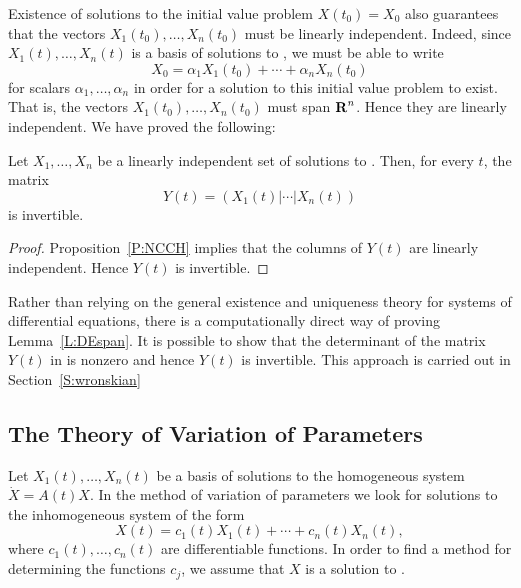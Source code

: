 \documentclass{ximera}
\begin{document}
Existence of solutions to the initial value problem $X(t_0)=X_0$ also
guarantees that the vectors $X_1(t_0),\ldots,X_n(t_0)$ must be linearly 
independent.  
Indeed, since $X_1(t),\ldots,X_n(t)$ is a 
basis of solutions to
, we must be able to write 
\[
X_0 = \alpha_1X_1(t_0) + \cdots + \alpha_nX_n(t_0)
\]
for scalars $\alpha_1,\ldots,\alpha_n$ in order for a solution to this 
initial value problem to exist.  That is, the vectors 
$X_1(t_0),\ldots,X_n(t_0)$  must span $\mbox{$\bf{R}$}^n$.   Hence they are linearly 
independent.  We have proved the following:

\begin{lemma}  \label{L:DEspan}
Let $X_1,\ldots,X_n$ be a linearly independent 
set of solutions to .
Then, for every $t$, the matrix 
\begin{equation}   \label{E:Y(t)}
Y(t) = \left(X_1(t)|\cdots |X_n(t)\right) 
\end{equation}
is invertible.
\end{lemma}

\begin{proof}  Proposition~\ref{P:NCCH} implies that the columns of $Y(t)$ are 
linearly independent.  Hence $Y(t)$ is invertible.  \end{proof}

Rather than relying on the general existence and uniqueness theory for
systems of differential equations, there is a computationally direct way of 
proving Lemma~\ref{L:DEspan}.   It is possible to show that the determinant 
of the matrix $Y(t)$ in  is nonzero and hence $Y(t)$ is invertible.
This approach is carried out in Section~\ref{S:wronskian}


\subsection*{The Theory of Variation of Parameters}

Let $X_1(t),\ldots,X_n(t)$ be a 
basis of solutions to the homogeneous 
system $\dot{X}=A(t)X$.   In the method of variation of parameters we look 
for solutions to  the inhomogeneous system  of the form
\[
X(t) = c_1(t)X_1(t) + \cdots + c_n(t)X_n(t),
\]
where $c_1(t),\ldots,c_n(t)$ are differentiable functions.  In order to 
find a method for determining the functions $c_j$, we assume that $X$ is 
a solution to .  
\end{document}
